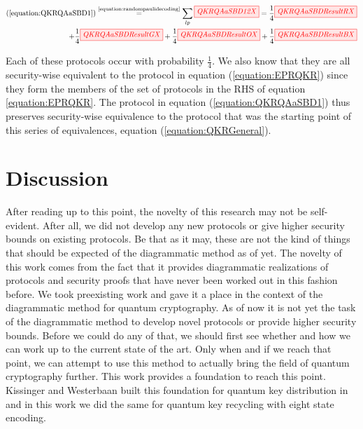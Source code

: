 \documentclass[]{article}
\newcommand{\equaltext}[1]{\ensuremath{\stackrel{\text{#1}}{=}}}
\begin{document}
\begin{equation}
	\label{equation:QKRQAaSBDResult}
	\begin{aligned}
	(\ref{equation:QKRQAaSBD1}) \equaltext{\ref{equation:randompaulidecoding}}
	\sum\limits_{lp}\tikzfig{QKRQAaSBD12X} 
	=
	 \frac{1}{4}\tikzfig{QKRQAaSBDResultRX} \\+
	\frac{1}{4}\tikzfig{QKRQAaSBDResultGX} +
	\frac{1}{4}\tikzfig{QKRQAaSBDResultOX} +
	\frac{1}{4}\tikzfig{QKRQAaSBDResultBX}
	\end{aligned}
\end{equation}

Each of these protocols occur with probability $\frac{1}{4}$. We also know that they are all security-wise equivalent to the protocol in equation (\ref{equation:EPRQKR}) since they form the members of the set of protocols in the RHS of equation \ref{equation:EPRQKR}. The protocol in equation (\ref{equation:QKRQAaSBD1}) thus preserves security-wise equivalence to the protocol that was the starting point of this series of equivalences, equation (\ref{equation:QKRGeneral}).

\section{Discussion}





After reading up to this point, the novelty of this research may not be self-evident. After all, we did not develop any new protocols or give higher security bounds on existing protocols. Be that as it may, these are not the kind of things that should be expected of the diagrammatic method as of yet. The novelty of this work comes from the fact that it provides diagrammatic realizations of protocols and security proofs that have never been worked out in this fashion before. We took preexisting work and gave it a place in the context of the diagrammatic method for quantum cryptography. As of now it is not yet the task of the diagrammatic method to develop novel protocols or provide higher security bounds. Before we could do any of that, we should first see whether and how we can work up to the current state of the art. Only when and if we reach that point, we can attempt to use this method to actually bring the field of quantum cryptography further. This work provides a foundation to reach this point. Kissinger and Westerbaan built this foundation for quantum key distribution in \cite{Kissinger2017} and in this work we did the same for quantum key recycling with eight state encoding.
\end{document}
